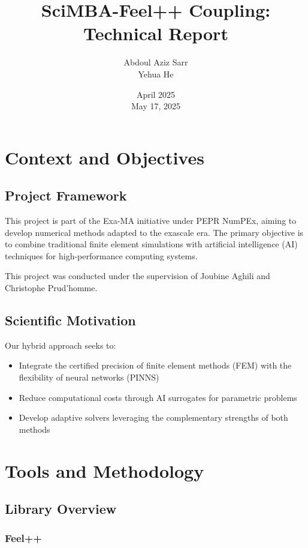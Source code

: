 \documentclass{article}
\title{SciMBA-Feel++ Coupling: Technical Report}
\author{Abdoul Aziz Sarr \\ Yehua He}
\date{April 2025 \\ May 17, 2025}
\begin{document}
\maketitle

\section{Context and Objectives}

\subsection{Project Framework}

This project is part of the Exa-MA initiative under PEPR NumPEx, aiming to develop numerical methods adapted to the exascale era. The primary objective is to combine traditional finite element simulations with artificial intelligence (AI) techniques for high-performance computing systems.

This project was conducted under the supervision of Joubine Aghili and
Christophe Prud’homme.

\subsection{Scientific Motivation}

Our hybrid approach seeks to:

\begin{itemize}
\item Integrate the certified precision of finite element methods (FEM) with the flexibility of neural networks (PINNS)
\item Reduce computational costs through AI surrogates for parametric problems
\item Develop adaptive solvers leveraging the complementary strengths of both methods
\end{itemize}

\section{Tools and Methodology}

\subsection{Library Overview}

\subsubsection{Feel++}
\end{document}

